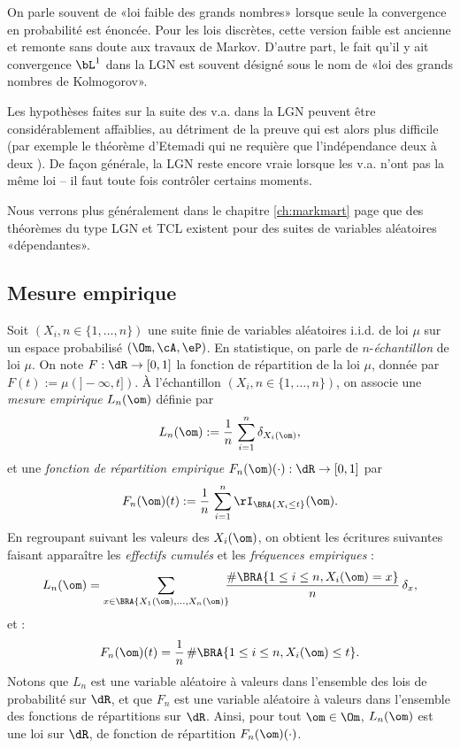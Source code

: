 \begin{rem}
  On parle souvent de «loi faible des grands nombres» lorsque seule la
  convergence en probabilité est énoncée. Pour les lois discrètes, cette
  version faible est ancienne et remonte sans doute aux travaux de Markov.
  D'autre part, le fait qu'il y ait convergence $\bL^1$ dans la LGN est
  souvent désigné sous le nom de «loi des grands nombres de Kolmogorov».
\end{rem}

\begin{rem}
  Les hypothèses faites sur la suite des v.a. dans la LGN peuvent être
  considérablement affaiblies, au détriment de la preuve qui est alors plus
  difficile (par exemple le théorème d'Etemadi qui ne requière que
  l'indépendance deux à deux \cite{borkar}). De façon générale, la LGN reste
  encore vraie lorsque les v.a. n'ont pas la même loi -- il faut toute fois
  contrôler certains moments.  
  
  Nous verrons plus généralement dans le chapitre \ref{ch:markmart} page \pageref{ch:markmart}
  que des théorèmes du type LGN et TCL existent pour des suites de variables
  aléatoires «dépendantes».
\end{rem}

%
\subsection{Mesure empirique}
%

Soit $(X_i,n\in\{1,\ldots,n\})$ une suite finie de variables aléatoires i.i.d.
de loi $\mu$ sur un espace probabilisé $(\Om,\cA,\eP)$.  En statistique, on
parle de $n$-\emph{échantillon} de loi $\mu$. On note $F:\dR\to[0,1]$ la
fonction de répartition de la loi $\mu$, donnée par $F(t):=\mu(]-\infty,t])$.
À l'échantillon $(X_i,n\in\{1,\ldots,n\})$, on associe une \emph{mesure
  empirique} $L_n(\om)$ définie par
$$
L_n(\om):=\frac{1}{n}\,\sum_{i=1}^n \delta_{X_i(\om)},
$$
et une \emph{fonction de répartition empirique}
$F_n(\om)(\cdot):\dR\to[0,1]$ par
$$
F_n(\om)(t):=\frac{1}{n}\,\sum_{i=1}^n \rI_{\BRA{X_i\leq t}}(\om).
$$
En regroupant suivant les valeurs des $X_i(\om)$, on obtient les écritures
suivantes faisant apparaître les \emph{effectifs cumulés} et les
\emph{fréquences empiriques} :
$$
L_n(\om)
=\sum_{x\in\BRA{X_1(\om),\ldots,X_n(\om)}}
\!\!\!\frac{\#\BRA{1\leq i \leq n, X_i(\om)=x}}{n}\,\delta_x,
$$
et :
$$
F_n(\om)(t)=\frac{1}{n}\, \#\BRA{1\leq i \leq n, X_i(\om)\leq t}.
$$
Notons que $L_n$ est une variable aléatoire à valeurs dans l'ensemble des
lois de probabilité sur $\dR$, et que $F_n$ est une variable aléatoire à
valeurs dans l'ensemble des fonctions de répartitions sur $\dR$. Ainsi, pour
tout $\om\in\Om$, $L_n(\om)$ est une loi sur $\dR$, de fonction de répartition
$F_n(\om)(\cdot)$.


